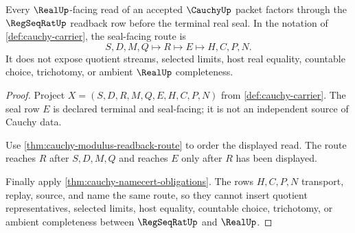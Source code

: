 \begin{theorem}
\label{thm:cauchy-core-regseqrat-real-seal}
Every $\RealUp$-facing read of an accepted $\CauchyUp$ packet factors through the $\RegSeqRatUp$ readback row before the terminal real seal. In the notation of \autoref{def:cauchy-carrier}, the seal-facing route is
$$
S,D,M,Q \longmapsto R \longmapsto E \longmapsto H,C,P,N .
$$
It does not expose quotient streams, selected limits, host real equality, countable choice, trichotomy, or ambient $\RealUp$ completeness.
\end{theorem}
\begin{proof}
Project $X=(S,D,R,M,Q,E,H,C,P,N)$ from \autoref{def:cauchy-carrier}. The seal row $E$ is declared terminal and seal-facing; it is not an independent source of Cauchy data.

Use \autoref{thm:cauchy-modulus-readback-route} to order the displayed read. The route reaches $R$ after $S,D,M,Q$ and reaches $E$ only after $R$ has been displayed.

Finally apply \autoref{thm:cauchy-namecert-obligations}. The rows $H,C,P,N$ transport, replay, source, and name the same route, so they cannot insert quotient representatives, selected limits, host equality, countable choice, trichotomy, or ambient completeness between $\RegSeqRatUp$ and $\RealUp$.
\end{proof}

